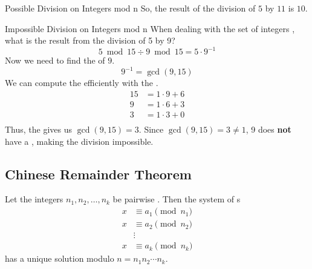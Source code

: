\begin{example}[]{Possible Division on Integers mod n}
  So, the result of the division of $5$ by $11$ is $10$.
\end{example}

\begin{example}[]{Impossible Division on Integers mod n}
  When dealing with the set of integers , what is the result from the division of 5 by 9?
  \tcblower{}
  \begin{equation*}
    5 \bmod 15 \div 9 \bmod 15 = 5 \cdot 9^{-1}
  \end{equation*}
  Now we need to find the  of $9$.
  \begin{equation*}
    9^{-1} = \gcd(9, 15)
  \end{equation*}
  We can compute the  efficiently with the .
  \begin{align*}
    15 &= 1 \cdot 9 + 6 \\
    9 &= 1 \cdot 6 + 3 \\
    3 &= 1 \cdot 3 + 0 \\
  \end{align*}
  Thus, the  gives us $\gcd(9, 15) = 3$.
  Since $\gcd(9, 15) = 3 \neq 1$, 9 does \textbf{not} have a , making the division impossible.
\end{example}

\subsection{Chinese Remainder Theorem}\label{subsec:Chinese_Remainder_Theorem}
\begin{theorem}\label{thm:Chinese_Remainder_Theorem}
  Let the integers $n_{1}, n_{2}, \ldots, n_{k}$ be pairwise .
  Then the system of s
  \begin{align*}
    x &\equiv a_{1} \pmod{n_{1}} \\
    x &\equiv a_{2} \pmod{n_{2}} \\
      &\vdots \\
    x &\equiv a_{k} \pmod{n_{k}}
  \end{align*}
  has a unique solution modulo $n = n_{1}n_{2} \cdots n_{k}$.
\end{theorem}

